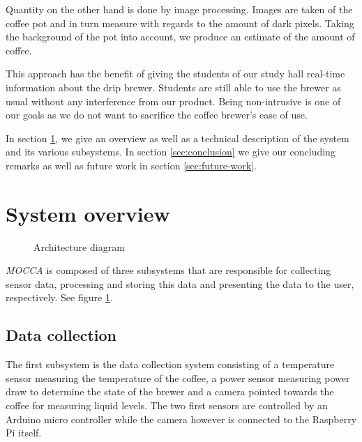 \documentclass[12pt,a4paper,oneside,article]{memoir}
\numberwithin{equation}{chapter}
\begin{document}
Quantity on the other hand is done by image processing. Images are taken of the
coffee pot and in turn measure with regards to the amount of dark pixels.
Taking the background of the pot into account, we produce an estimate of
the amount of coffee.

This approach has the benefit of giving the students of our study hall 
real-time information about the drip brewer. Students are still able to use the 
brewer as usual without any interference from our product. Being non-intrusive 
is one of our goals as we do not want to sacrifice the coffee brewer's ease 
of use.

In section \ref{sec:system-overview}, we give an overview as well as a technical
description of the system and its various subsystems. In section
\ref{sec:conclusion} we give our concluding remarks as well as future work in
section \ref{sec:future-work}.

\section{System overview}\label{sec:system-overview}
\begin{figure}[h]
  \centerfloat{}
  \scalebox{.75}{}
  \caption{Architecture diagram}\label{fig:architecture}
\end{figure}
\textit{MOCCA} is composed of three subsystems that are responsible for
collecting sensor data, processing and storing this data and presenting the data
to the user, respectively. See figure \ref{fig:architecture}.

\subsection{Data collection}\label{sec:data-collection}
The first subsystem is the data collection system consisting of a temperature
sensor measuring the temperature of the coffee, a power sensor measuring power
draw to determine the state of the brewer and a camera pointed towards the
coffee for measuring liquid levels. The two first sensors are controlled by an
Arduino micro controller while the camera however is connected to the Raspberry
Pi itself.
\end{document}

